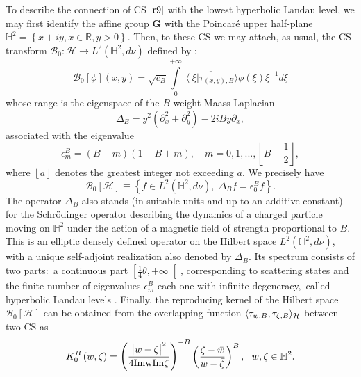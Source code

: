 To describe the connection of CS $\eqref{r9} $ with the lowest
hyperbolic Landau level, we may first identify the affine group $\mathbf{G}$
with the Poincar\'{e} upper half-plane $\mathbb{H}^{2}=\left\{ x+iy,x\in 
\mathbb{R},y>0\right\} $. Then, to these CS we may attach, as usual, the CS
transform $\mathcal{B}_{0}:\mathcal{H}\rightarrow L^{2}\left( \mathbb{H}%
^{2},d\nu \right) $ defined by \cite{Mou2}: 
\begin{equation}
\label{r10}
\mathcal{B}_{0}[\phi ]\left( x,y\right) =\sqrt{c_{B}}\int\limits_{0}^{+%
\infty }\overline{\left\langle \xi \right\vert \tau _{(x,y),B}\rangle }\phi
(\xi )\xi ^{-1}d\xi   
\end{equation}
whose range is the eigenspace of the $B$-weight Maass Laplacian 
\begin{equation}
\Delta _{B}=y^{2}\left( \partial _{x}^{2}+\partial _{y}^{2}\right)
-2iBy\partial _{x},  
\end{equation}
associated with the eigenvalue
\begin{equation}
\label{r11}
\epsilon _{m}^{B}=(B-m)\left( 1-B+m\right) ,\quad m=0,1,...,\left\lfloor B-%
{\frac12}%
\right\rfloor ,  
\end{equation}
where $\left\lfloor a\right\rfloor $ denotes the greatest integer not
exceeding $a.$ We precisely have 
\begin{equation}
\label{r12}
\mathcal{B}_{0}[\mathcal{H}]\equiv \left\{ f\in L^{2}\left( \mathbb{H}%
^{2},d\nu \right) ,\;\Delta _{B}f=\epsilon _{0}^{B}f\right\} .  
\end{equation}
The operator $\Delta _{B}$ also stands (in suitable units and up to an
additive constant) for the Schr\"{o}dinger operator describing the dynamics
of a charged particle moving on $\mathbb{H}^{2}$ under the action of a
magnetic field of strength proportional to $B.$ This is an elliptic densely
defined operator on the Hilbert space $L^{2}(\mathbb{H}^{2},d\nu )$, with a
unique self-adjoint realization also denoted by $\Delta _{B}$. Its spectrum
consists of two parts:\textit{\ }a continuous part $\left[ 
{\frac14}%
\theta ,+\infty \right[ $, corresponding to scattering states and the finite
number of eigenvalues $\epsilon _{m}^{B}$ each one with infinite
degeneracy,\ called hyperbolic Landau levels . Finally, the reproducing
kernel of the Hilbert space $\mathcal{B}_{0}[\mathcal{H}]$ can be obtained
from the overlapping function $\langle \tau _{w,B},\tau _{\zeta ,B}\rangle _{%
\mathcal{H}}$ between two CS as 
\begin{equation}
\label{r13}
K_{0}^{B}\left( w,\zeta \right) =\left( \frac{\left\vert w-\bar{\zeta}\right\vert ^{2}}{4\rm{Im}w\rm{Im}\zeta }\right) ^{-B}\left( \frac{\zeta-\bar{w}}{w-\bar{\zeta}}\right) ^{B}{},\text{ \ }w,\zeta \in \mathbb{H}^{2}.
\end{equation}



